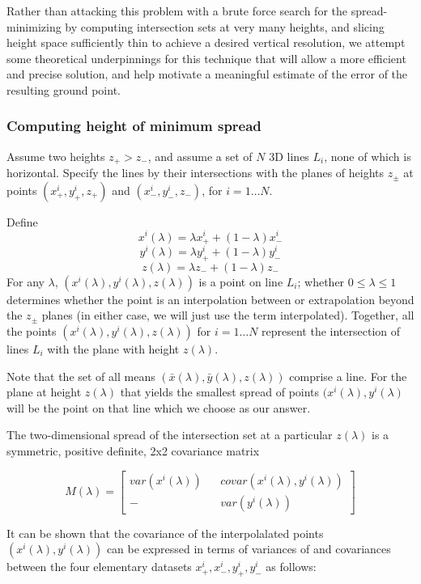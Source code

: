 \documentclass{article}
\begin{document}
Rather than attacking this problem with a brute force search for the
spread-minimizing by computing intersection sets at very many heights,
and slicing height space sufficiently thin to achieve a desired
vertical resolution, we attempt some theoretical underpinnings for
this technique that will allow a more efficient and precise solution,
and help motivate a meaningful estimate of the error of the resulting
ground point.

\subsubsection{Computing height of minimum spread}
Assume two heights $z_{+} > z_{-}$, and assume a set of $N$ 3D lines
$L_i$, none of which is horizontal. Specify the lines by their
intersections with the planes of heights $z_\pm$ at points
$(x_{+}^{i},y_{+}^{i}, z_+)$ and $(x_{-}^{i},y_{-}^{i}, z_-)$, for
$i=1\ldots N$.

Define
$$x^i(\lambda) = \lambda x^i_+ + (1-\lambda) x^i_-$$
$$y^i(\lambda) = \lambda y^i_+ + (1-\lambda) y^i_-$$
$$z(\lambda) = \lambda z_- + (1-\lambda) z_-$$ For any $\lambda$,
$(x^i(\lambda), y^i(\lambda), z(\lambda))$ is a point on line $L_i$;
whether $0\le\lambda\le 1$ determines whether the point is an
interpolation between or extrapolation beyond the $z_\pm$ planes (in
either case, we will just use the term interpolated). Together, all
the points $(x^i(\lambda), y^i(\lambda), z(\lambda))$ for $i=1\ldots
N$ represent the intersection of lines $L_i$ with the plane with
height $z(\lambda)$.

Note that the set of all means
$(\bar{x}(\lambda),\bar{y}(\lambda),z(\lambda))$ comprise a line. For
the plane at height $z(\lambda)$ that yields the smallest spread of
points $(x^i(\lambda),y^i(\lambda)$ will be the point on that line
which we choose as our answer.

The two-dimensional spread of the intersection set at a particular
$z(\lambda)$ is a symmetric, positive definite, 2x2
covariance matrix

\[M(\lambda) =
\begin{bmatrix}
 var(x^i(\lambda)) && covar(x^i(\lambda),y^i(\lambda)) \\
  -                && var(y^i(\lambda))
\end{bmatrix}
\]

It can be shown that the covariance of the interpolalated points
$(x^i(\lambda),y^i(\lambda))$ can be expressed in terms of variances of and covariances between the four elementary datasets $x^i_+, x^i_-, y^i_+, y^i_-$ as follows:
\end{document}
